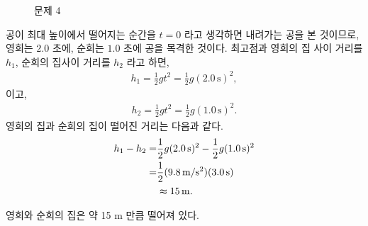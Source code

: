 \documentclass[floatfix,nofootinbib,superscriptaddress,fleqn,preprint]{revtex4}
\begin{document}
\begin{figure}[htbp]
  \centering
  \caption{ 문제 4}
  \label{pic:10}
\end{figure}
공이 최대 높이에서 떨어지는 순간을 $t=0$ 라고 생각하면
내려가는 공을 본 것이므로, 영희는 $2.0$ 초에, 
순희는 $1.0$ 초에 공을 목격한 것이다.
최고점과 영희의 집 사이 거리를 $h_1$, 순희의 집사이 거리를 $h_2$ 라고 하면,
\begin{align}
  h_1 = \frac{1}{2}gt^2=\frac{1}{2}g(2.0\,\mathrm{s})^2 ,
\end{align}
이고,
\begin{align}
  h_2 = \frac{1}{2}gt^2=\frac{1}{2}g(1.0\,\mathrm{s})^2.
\end{align}
영희의 집과 순희의 집이 떨어진 거리는 다음과 같다.
\begin{align}
  \begin{split}
    h_1-h_2 =&\frac{1}{2}g(2.0\,\mathrm{s})^2
    -\frac{1}{2}g(1.0\,\mathrm{s})^2 \\
    =& \frac{1}{2}(9.8\,\mathrm{m/s^2})(3.0\,\mathrm{s})\\
    &\thickapprox 15\,\mathrm{m}.
  \end{split}
\end{align}

영희와 순희의 집은 약 15 m 만큼 떨어져 있다.
\end{document}
